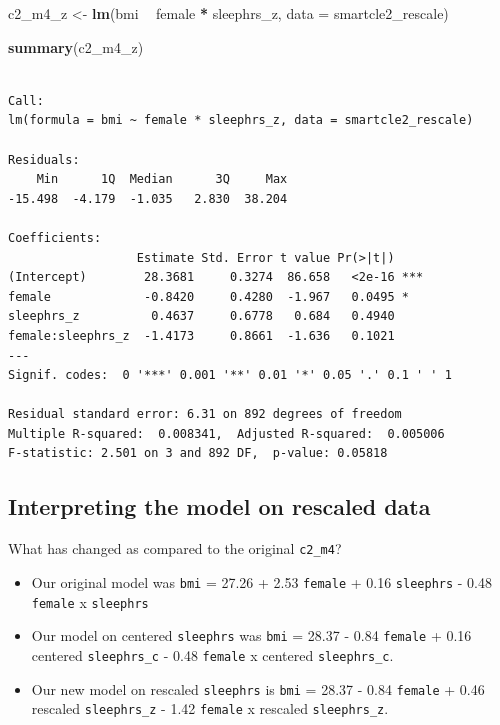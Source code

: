 \documentclass[]{book}
\newenvironment{Shaded}{\begin{snugshade}}{\end{snugshade}}
\newcommand{\KeywordTok}[1]{\textcolor[rgb]{0.13,0.29,0.53}{\textbf{#1}}}
\newcommand{\DataTypeTok}[1]{\textcolor[rgb]{0.13,0.29,0.53}{#1}}
\newcommand{\StringTok}[1]{\textcolor[rgb]{0.31,0.60,0.02}{#1}}
\newcommand{\OperatorTok}[1]{\textcolor[rgb]{0.81,0.36,0.00}{\textbf{#1}}}
\newcommand{\NormalTok}[1]{#1}
\providecommand{\tightlist}{%
  \setlength{\itemsep}{0pt}\setlength{\parskip}{0pt}}
\theoremstyle{definition}
\theoremstyle{definition}
\theoremstyle{definition}
\theoremstyle{remark}
\begin{document}
\begin{Shaded}
\begin{Highlighting}[]
\NormalTok{c2_m4_z <-}\StringTok{ }\KeywordTok{lm}\NormalTok{(bmi }\OperatorTok{~}\StringTok{ }\NormalTok{female }\OperatorTok{*}\StringTok{ }\NormalTok{sleephrs_z, }\DataTypeTok{data =}\NormalTok{ smartcle2_rescale)}

\KeywordTok{summary}\NormalTok{(c2_m4_z)}
\end{Highlighting}
\end{Shaded}

\begin{verbatim}

Call:
lm(formula = bmi ~ female * sleephrs_z, data = smartcle2_rescale)

Residuals:
    Min      1Q  Median      3Q     Max 
-15.498  -4.179  -1.035   2.830  38.204 

Coefficients:
                  Estimate Std. Error t value Pr(>|t|)    
(Intercept)        28.3681     0.3274  86.658   <2e-16 ***
female             -0.8420     0.4280  -1.967   0.0495 *  
sleephrs_z          0.4637     0.6778   0.684   0.4940    
female:sleephrs_z  -1.4173     0.8661  -1.636   0.1021    
---
Signif. codes:  0 '***' 0.001 '**' 0.01 '*' 0.05 '.' 0.1 ' ' 1

Residual standard error: 6.31 on 892 degrees of freedom
Multiple R-squared:  0.008341,  Adjusted R-squared:  0.005006 
F-statistic: 2.501 on 3 and 892 DF,  p-value: 0.05818
\end{verbatim}

\subsection{Interpreting the model on rescaled
data}\label{interpreting-the-model-on-rescaled-data}

What has changed as compared to the original \texttt{c2\_m4}?

\begin{itemize}
\tightlist
\item
  Our original model was \texttt{bmi} = 27.26 + 2.53 \texttt{female} +
  0.16 \texttt{sleephrs} - 0.48 \texttt{female} x \texttt{sleephrs}
\item
  Our model on centered \texttt{sleephrs} was \texttt{bmi} = 28.37 -
  0.84 \texttt{female} + 0.16 centered \texttt{sleephrs\_c} - 0.48
  \texttt{female} x centered \texttt{sleephrs\_c}.
\item
  Our new model on rescaled \texttt{sleephrs} is \texttt{bmi} = 28.37 -
  0.84 \texttt{female} + 0.46 rescaled \texttt{sleephrs\_z} - 1.42
  \texttt{female} x rescaled \texttt{sleephrs\_z}.
\end{itemize}
\end{document}
